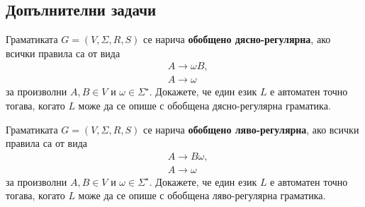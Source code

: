 \subsection*{Допълнителни задачи}

\begin{extra}

\begin{problem}
  Граматиката $G = (V, \Sigma, R, S)$ се нарича {\bf обобщено дясно-регулярна},
  ако всички правила са от вида 
  \begin{align*}
    & A \to \omega B,\\
    & A \to \omega
  \end{align*}
  за произволни $A, B \in V$ и $\omega \in \Sigma^\star$.
  Докажете, че един език $L$ е автоматен точно тогава, когато $L$ може да се опише с обобщена дясно-регулярна граматика.
\end{problem}

\begin{problem}
  Граматиката $G = (V, \Sigma, R, S)$ се нарича {\bf обобщено ляво-регулярна},
  ако всички правила са от вида 
  \begin{align*}
    & A \to B\omega,\\
    & A \to \omega
  \end{align*}
  за произволни $A, B \in V$ и $\omega \in \Sigma^\star$.
  Докажете, че един език $L$ е автоматен точно тогава, когато $L$ може да се опише с обобщена ляво-регулярна граматика.
\end{problem}

\end{extra}


